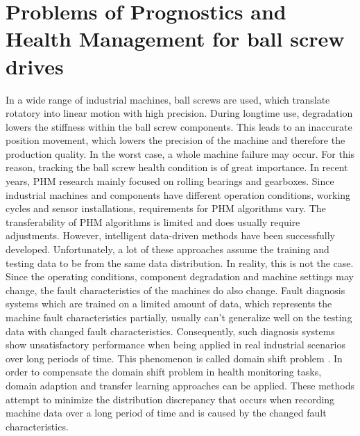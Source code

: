 \section{Problems of Prognostics and Health Management for ball screw drives}
In a wide range of industrial machines, ball screws are used, which translate rotatory into linear motion with high precision. During longtime use, degradation lowers the stiffness within the ball screw components. This leads to an inaccurate position movement, which lowers the precision of the machine and therefore the production quality. In the worst case, a whole machine failure may occur. For this reason, tracking the ball screw health condition is of great importance. In recent years, PHM research mainly focused on rolling bearings and gearboxes. Since industrial machines and components have different operation conditions, working cycles and sensor installations, requirements for PHM algorithms vary. The transferability of PHM algorithms is limited and does usually require adjustments. However, intelligent data-driven methods have been successfully developed. Unfortunately, a lot of these approaches assume the training and testing data to be from the same data distribution. In reality, this is not the case. Since the operating conditions, component degradation and machine settings may change, the fault characteristics of the machines do also change. Fault diagnosis systems which are trained on a limited amount of data, which represents the machine fault characteristics partially, usually can't generalize well on the testing data with changed fault characteristics. Consequently, such diagnosis systems show unsatisfactory performance when being applied in real industrial scenarios over long periods of time. This phenomenon is called domain shift problem \cite{AZAMFAR2020103932}. In order to compensate the domain shift problem in health monitoring tasks, domain adaption and transfer learning approaches can be applied. These methods attempt to minimize the distribution discrepancy that occurs when recording machine data over a long period of time and is caused by the changed fault characteristics. 

